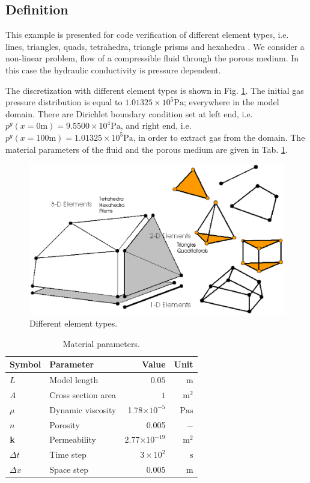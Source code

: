 \subsection{Definition}
This example is presented for code verification of different element types, i.e. lines, triangles, quads, tetrahedra, triangle prisms and hexahedra \cite{WanKol:2007}. We consider a non-linear problem, flow of a compressible fluid through the porous medium. In this case the hydraulic conductivity is pressure dependent.


The discretization with different element types is shown in Fig. \ref{fig:h_elements}. The initial gas pressure distribution is equal to $1.01325\times10^5 \mathrm{Pa}$; everywhere in the model domain. There are Dirichlet boundary condition set at left end, i.e. $p^g(x=0 \mathrm m) = 9.5500\times10^4\mathrm{Pa}$, and right end, i.e. $p^g(x=100 \mathrm m) = 1.01325\times10^5\mathrm{Pa}$, in order to extract gas from the domain. The material parameters of the fluid and the porous medium are given in Tab. \ref{tab:apl_h}.
\begin{figure}[htb!]
\center
\includegraphics[scale=0.45]{PART_II/G/elements.eps}
\caption{Different element types.} 
\label{fig:h_elements}
\end{figure}
\begin{table}[htb]
\caption{\label{tab:apl_h}Material parameters.}
\begin{center}
\begin{tabular}{llrr}
\toprule
Symbol & Parameter & Value & Unit \\
\midrule
$L$ & Model length & $0.05$ & $\mathrm m$\\
$A$ & Cross section area & $1$  & $\mathrm{m^2}$ \\
$\mu$ & Dynamic viscosity & 1.78$\times 10^{-5}$ & $\mathrm{Pa s}$ \\
$n$ & Porosity & 0.005 & $-$\\
$\mathbf k$ & Permeability & 2.77$\times 10^{-19}$ & $\mathrm{m^2}$ \\
$\Delta t$ & Time step & $ 3\times 10^2$ & $\mathrm{s}$\\
$\Delta x$ & Space step & $0.005$ & $\mathrm{m}$\\
\bottomrule
\end{tabular}
\end{center}
\end{table}
